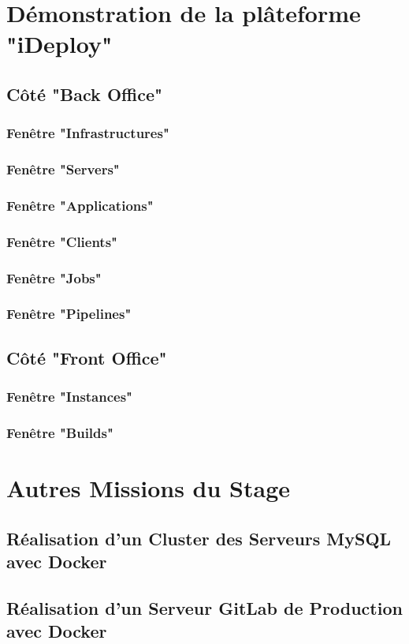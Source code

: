 \begin{appendices}

\chapter{Démonstration de la plâteforme "iDeploy"}

\section{Côté "Back Office"}

\subsection{Fenêtre "Infrastructures"}

\subsection{Fenêtre "Servers"}

\subsection{Fenêtre "Applications"}

\subsection{Fenêtre "Clients"}

\subsection{Fenêtre "Jobs"}

\subsection{Fenêtre "Pipelines"}

\section{Côté "Front Office"}

\subsection{Fenêtre "Instances"}

\subsection{Fenêtre "Builds"}

\chapter{Autres Missions du Stage}

\section{Réalisation d'un Cluster des Serveurs MySQL avec Docker}

\section{Réalisation d'un Serveur GitLab de Production avec Docker}

\end{appendices}
